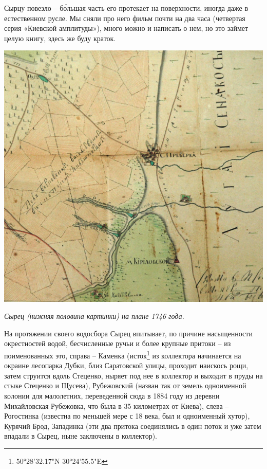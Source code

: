 Сырцу повезло – б\'ольшая часть его протекает на поверхности, иногда даже в естественном русле. Мы сняли про него фильм почти на два часа (четвертая серия «Киевской амплитуды»), много можно и написать о нем, но это займет целую книгу, здесь же буду краток.

\begin{center}
\includegraphics[width=\linewidth]{chast-colebanie-osnov/pochayna/1746-syrec.jpg}

\textit{Сырец (нижняя половина картинки) на плане 1746 года.}
\end{center}

На протяжении своего водосбора Сырец впитывает, по причине насыщенности окрестностей водой, бесчисленные ручьи и более крупные притоки – из поименованных это, справа – Каменка (исток\footnote{50°28'32.17"N 30°24'55.5"E} из коллектора начинается на окраине лесопарка Дубки, близ Саратовской улицы, проходит наискось рощи, затем струится вдоль Стеценко, ныряет под нее в коллектор и выходит в пруды на стыке Стеценко и Щусева), Рубежовский (назван так от земель одноименной колонии для малолетних, переведенной сюда в 1884 году из деревни Михайловская Рубежовка, что была в 35 километрах от Киева), слева – Рогостинка (известна по меньшей мере с 18 века, был и одноименный хутор), Курячий Брод, Западинка (эти два притока соединялись в один поток и уже затем впадали в Сырец, ныне заключены в коллектор). 


